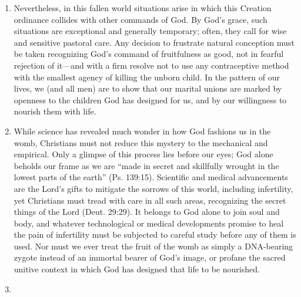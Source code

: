 \documentclass[
]{book}
\begin{document}
\begin{enumerate}
\def\labelenumi{\arabic{enumi}.}
\setcounter{enumi}{7}
\item
  Nevertheless, in this fallen world situations arise in which this Creation ordinance collides with other commands of God. By God's grace, such situations are exceptional and generally temporary; often, they call for wise and sensitive pastoral care. Any decision to frustrate natural conception must be taken recognizing God's command of fruitfulness as good, not in fearful rejection of it---and with a firm resolve not to use any contraceptive method with the smallest agency of killing the unborn child. In the pattern of our lives, we (and all men) are to show that our marital unions are marked by openness to the children God has designed for us, and by our willingness to nourish them with life.
\item
  While science has revealed much wonder in how God fashions us in the womb, Christians must not reduce this mystery to the mechanical and empirical. Only a glimpse of this process lies before our eyes; God alone beholds our frame as we are ``made in secret and skillfully wrought in the lowest parts of the earth'' (Ps. 139:15). Scientific and medical advancements are the Lord's gifts to mitigate the sorrows of this world, including infertility, yet Christians must tread with care in all such areas, recognizing the secret things of the Lord (Deut. 29:29). It belongs to God alone to join soul and body, and whatever technological or medical developments promise to heal the pain of infertility must be subjected to careful study before any of them is used. Nor must we ever treat the fruit of the womb as simply a DNA-bearing zygote instead of an immortal bearer of God's image, or profane the sacred unitive context in which God has designed that life to be nourished.
\item

\end{enumerate}
\end{document}
